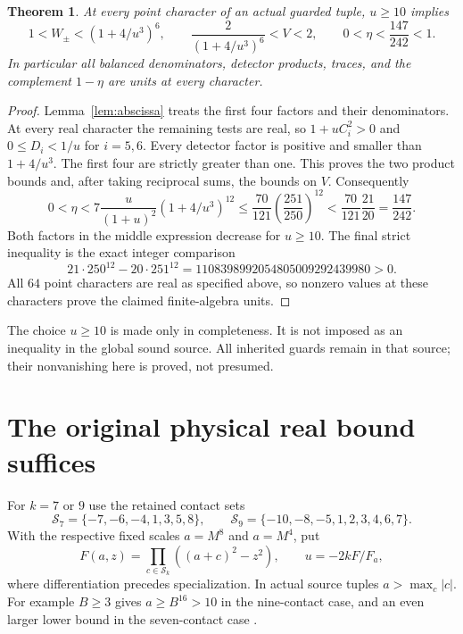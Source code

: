 \documentclass[11pt,a4paper]{article}
\newtheorem{theorem}{Theorem}[section]
\begin{document}
\begin{theorem}\label{thm:uniform}
At every point character of an actual guarded tuple, $u\ge10$ implies
\begin{equation}\label{eq:bound}
 1<W_\pm<(1+4/u^3)^6,\qquad
 \frac2{(1+4/u^3)^6}<V<2,\qquad
                  0<\eta<\frac{147}{242}<1.
\end{equation}
In particular all balanced denominators, detector products, traces,
and the complement $1-\eta$ are units at every character.
\end{theorem}
\begin{proof}
Lemma~\ref{lem:abscissa} treats the first four factors and their
denominators. At every real character the remaining tests are real,
so $1+uC_i^2>0$ and $0\le D_i<1/u$ for $i=5,6$.
Every detector factor is positive and smaller than $1+4/u^3$.
The first four are strictly greater than one. This proves the two
product bounds and, after taking reciprocal sums, the bounds on $V$.
Consequently
\[
 0<\eta<7\frac{u}{(1+u)^2}(1+4/u^3)^{12}
 \le \frac{70}{121}\left(\frac{251}{250}\right)^{12}
 <\frac{70}{121}\frac{21}{20}=\frac{147}{242}.
\]
Both factors in the middle expression decrease for $u\ge10$.
The final strict inequality is the exact integer comparison
\[
 21\cdot250^{12}-20\cdot251^{12}
                    =1108398992054805009292439980>0.
\]
All $64$ point characters are real as specified above, so nonzero
values at these characters prove the claimed finite-algebra units.
\end{proof}

The choice $u\ge10$ is made only in completeness. It is not imposed
as an inequality in the global sound source. All inherited guards
remain in that source; their nonvanishing here is proved, not presumed.

\section{The original physical real bound suffices}
For $k=7$ or $9$ use the retained contact sets
\[
 \mathcal S_7=\{-7,-6,-4,1,3,5,8\},\qquad
 \mathcal S_9=\{-10,-8,-5,1,2,3,4,6,7\}.
\]
With the respective fixed scales $a=M^8$ and $a=M^4$, put
\[
 F(a,z)=\prod_{c\in\mathcal S_k}((a+c)^2-z^2),\qquad
                         u=-2kF/F_a,
\]
where differentiation precedes specialization. In actual source tuples
$a>\max_c|c|$. For example $B\ge3$ gives $a\ge B^{16}>10$
in the nine-contact case, and an even larger lower bound in the
seven-contact case \cite{Even,Seven}.
\end{document}
